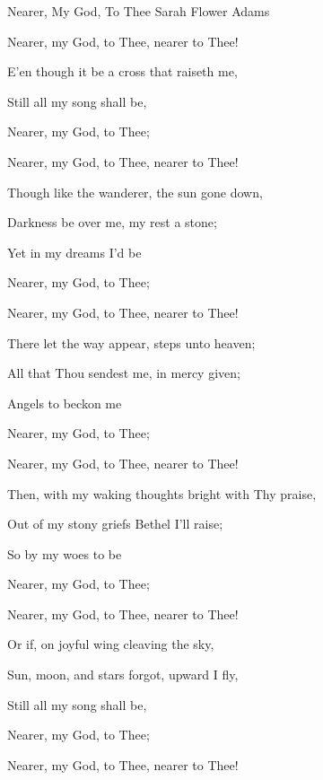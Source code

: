 \documentclass[12pt]{book}
\begin{document}
\begin{song}{Nearer, My God, To Thee}{}
  {\SBPubDom}
  {Sarah Flower Adams}
  {}
  {}

  \begin{SBVerse}
    Nearer, my God, to Thee, nearer to Thee!

    E'en though it be a cross that raiseth me,

    Still all my song shall be,

    Nearer, my God, to Thee;

    Nearer, my God, to Thee, nearer to Thee!
  \end{SBVerse}

  \begin{SBVerse}
    Though like the wanderer, the sun gone down,

    Darkness be over me, my rest a stone;

    Yet in my dreams I'd be

    Nearer, my God, to Thee;

    Nearer, my God, to Thee, nearer to Thee!
  \end{SBVerse}

  \begin{SBVerse}
    There let the way appear, steps unto heaven;

    All that Thou sendest me, in mercy given;

    Angels to beckon me

    Nearer, my God, to Thee;

    Nearer, my God, to Thee, nearer to Thee!
  \end{SBVerse}

  \begin{SBVerse}
    Then, with my waking thoughts bright with Thy praise,

    Out of my stony griefs Bethel I'll raise;

    So by my woes to be

    Nearer, my God, to Thee;

    Nearer, my God, to Thee, nearer to Thee!
  \end{SBVerse}

  \begin{SBVerse}
    Or if, on joyful wing cleaving the sky,

    Sun, moon, and stars forgot, upward I fly,

    Still all my song shall be,

    Nearer, my God, to Thee;

    Nearer, my God, to Thee, nearer to Thee!
  \end{SBVerse}
\end{song}
\end{document}
